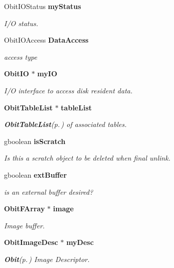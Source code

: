 \begin{CompactItemize}
Obit\-IOStatus {\bf my\-Status}
\begin{CompactList}\small\item\em I/O status. \item\end{CompactList}\item 
Obit\-IOAccess {\bf Data\-Access}
\begin{CompactList}\small\item\em access type \item\end{CompactList}\item 
{\bf Obit\-IO} $\ast$ {\bf my\-IO}
\begin{CompactList}\small\item\em I/O interface to access disk resident data. \item\end{CompactList}\item 
{\bf Obit\-Table\-List} $\ast$ {\bf table\-List}
\begin{CompactList}\small\item\em {\bf Obit\-Table\-List}{\rm (p.\,\pageref{structObitTableList})} of associated tables. \item\end{CompactList}\item 
gboolean {\bf is\-Scratch}
\begin{CompactList}\small\item\em Is this a scratch object to be deleted when final unlink. \item\end{CompactList}\item 
gboolean {\bf ext\-Buffer}
\begin{CompactList}\small\item\em is an external buffer desired? \item\end{CompactList}\item 
{\bf Obit\-FArray} $\ast$ {\bf image}
\begin{CompactList}\small\item\em Image buffer. \item\end{CompactList}\item 
{\bf Obit\-Image\-Desc} $\ast$ {\bf my\-Desc}
\begin{CompactList}\small\item\em {\bf Obit}{\rm (p.\,\pageref{structObit})} Image Descriptor. \item\end{CompactList}\item 

\end{CompactItemize}
